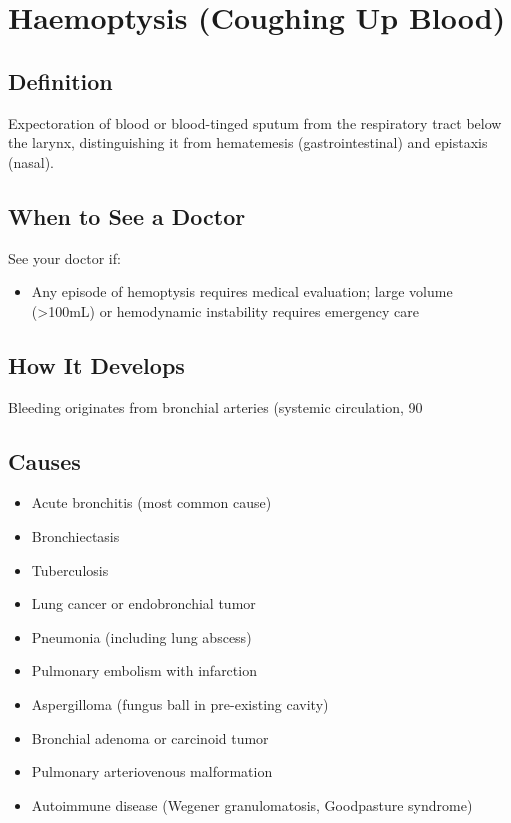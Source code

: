 \chapter{Haemoptysis (Coughing Up Blood)}

\section*{Definition}
Expectoration of blood or blood-tinged sputum from the respiratory tract below the larynx, distinguishing it from hematemesis (gastrointestinal) and epistaxis (nasal).

\section*{When to See a Doctor}
See your doctor if:
\begin{itemize}
  \item Any episode of hemoptysis requires medical evaluation; large volume (>100mL) or hemodynamic instability requires emergency care
\end{itemize}

\section*{How It Develops}
Bleeding originates from bronchial arteries (systemic circulation, 90%

\section*{Causes}
\begin{itemize}
  \item Acute bronchitis (most common cause)
  \item Bronchiectasis
  \item Tuberculosis
  \item Lung cancer or endobronchial tumor
  \item Pneumonia (including lung abscess)
  \item Pulmonary embolism with infarction
  \item Aspergilloma (fungus ball in pre-existing cavity)
  \item Bronchial adenoma or carcinoid tumor
  \item Pulmonary arteriovenous malformation
  \item Autoimmune disease (Wegener granulomatosis, Goodpasture syndrome)
\end{itemize}

